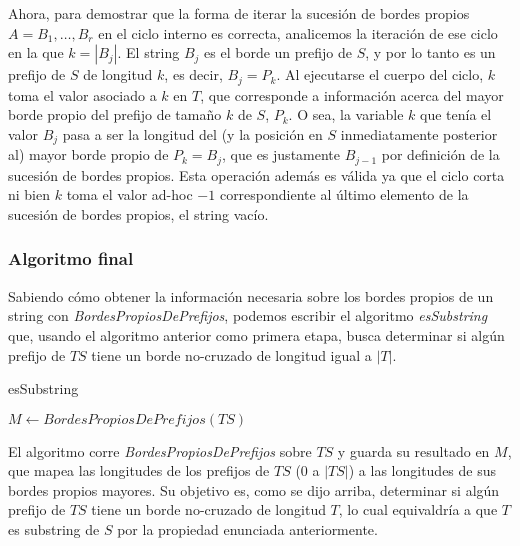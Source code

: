 Ahora, para demostrar que la forma de iterar la sucesión de bordes propios $A = B_1, \dots, B_r$ en el ciclo interno es correcta, analicemos la iteración de ese ciclo en la que $k = |B_j|$. El string $B_j$ es el borde un prefijo de $S$, y por lo tanto es un prefijo de $S$ de longitud $k$, es decir, $B_j = P_k$. Al ejecutarse el cuerpo del ciclo, $k$ toma el valor asociado a $k$ en $T$, que corresponde a información acerca del mayor borde propio del prefijo de tamaño $k$ de $S$, $P_k$. O sea, la variable $k$ que tenía el valor $B_j$ pasa a ser la longitud del (y la posición en $S$ inmediatamente posterior al) mayor borde propio de $P_k = B_j$, que es justamente $B_{j-1}$ por definición de la sucesión de bordes propios. Esta operación además es válida ya que el ciclo corta ni bien $k$ toma el valor ad-hoc $-1$ correspondiente al último elemento de la sucesión de  bordes propios, el string vacío.
 
\subsubsection{Algoritmo final}

Sabiendo cómo obtener la información necesaria sobre los bordes propios de un string con \textit{BordesPropiosDePrefijos}, podemos escribir el algoritmo \textit{esSubstring} que, usando el algoritmo anterior como primera etapa, busca determinar si algún prefijo de $TS$ tiene un borde no-cruzado de longitud igual a $|T|$.

\bigskip

\begin{algorithm}[H]
	\caption{esSubstring}

	$M \gets \mathit{BordesPropiosDePrefijos}(TS)$
	
	 {
		 {
		}
	}

\end{algorithm}

\bigskip

El algoritmo corre \textit{BordesPropiosDePrefijos} sobre $TS$ y guarda su resultado en $M$, que mapea las longitudes de los prefijos de $TS$ ($0$ a $|TS|$) a las longitudes de sus bordes propios mayores. Su objetivo es, como se dijo arriba, determinar si algún prefijo de $TS$ tiene un borde no-cruzado de longitud $T$, lo cual equivaldría a que $T$ es substring de $S$ por la propiedad enunciada anteriormente.

